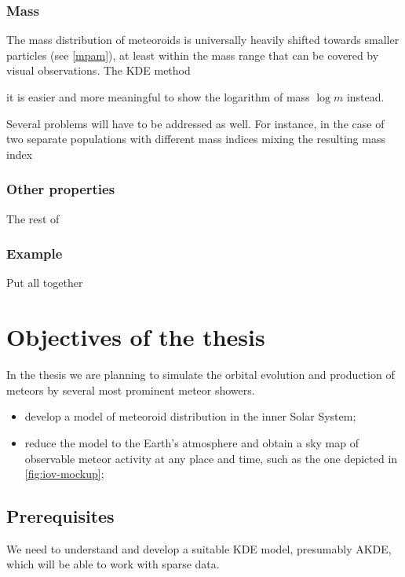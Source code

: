         \subsubsection{Mass} \label{iovm}
            The mass distribution of meteoroids is universally heavily shifted
            towards smaller particles (see \cref{mpam}), at least within the mass
            range that can be covered by visual observations.
            The KDE method

            it is easier and more meaningful to show the logarithm of mass $\log m$ instead.

            Several problems will have to be addressed as well. For instance, in the case
            of two separate populations with different mass indices mixing the resulting
            mass index 

        \subsubsection{Other properties} \label{iovo}
           The rest of 

        \subsubsection{Example} \label{iove}
            Put all together



\section{Objectives of the thesis} \label{iO}
    In the thesis we are planning to simulate the orbital evolution and production of meteors
    by several most prominent meteor showers.

    \begin{itemize}
        \item develop a model of meteoroid distribution in the inner Solar System;
        \item reduce the model to the Earth's atmosphere and obtain a sky map
            of observable meteor activity at any place and time,
            such as the one depicted in \cref{fig:iov-mockup};
    \end{itemize}

    \subsection{Prerequisites} \label{iOp}
        We need to understand and develop a suitable KDE model, presumably AKDE,
        which will be able to work with sparse data.


